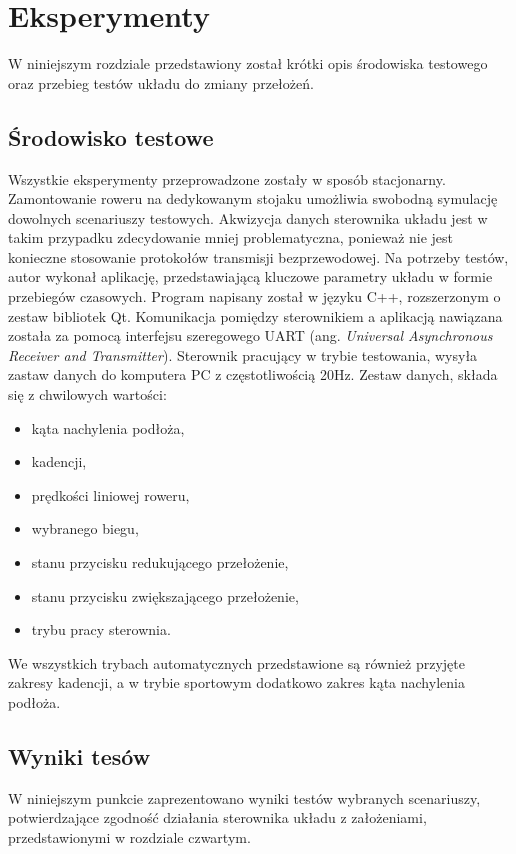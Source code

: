 \chapter{Eksperymenty}

W niniejszym rozdziale przedstawiony został krótki opis środowiska testowego oraz przebieg testów układu do zmiany przełożeń.

\section{Środowisko testowe}
Wszystkie eksperymenty przeprowadzone zostały w sposób stacjonarny. Zamontowanie roweru na dedykowanym stojaku umożliwia swobodną symulację dowolnych scenariuszy testowych. Akwizycja danych sterownika układu jest w takim przypadku zdecydowanie mniej problematyczna, ponieważ nie jest konieczne stosowanie protokołów transmisji bezprzewodowej. 
Na potrzeby testów, autor wykonał aplikację, przedstawiającą kluczowe parametry układu w formie przebiegów czasowych. Program napisany został w języku C++, rozszerzonym o zestaw bibliotek Qt. Komunikacja pomiędzy sterownikiem a aplikacją nawiązana została za pomocą interfejsu szeregowego UART (ang. \textit{Universal Asynchronous Receiver and Transmitter}). Sterownik pracujący w trybie testowania, wysyła zastaw danych do komputera PC z częstotliwością 20Hz. Zestaw danych, składa się z chwilowych wartości:
\begin{itemize}
 \item
 kąta nachylenia podłoża,
 \item
 kadencji,
 \item
 prędkości liniowej roweru,
 \item
 wybranego biegu,
 \item
 stanu przycisku redukującego przełożenie,
 \item
 stanu przycisku zwiększającego przełożenie,
 \item
 trybu pracy sterownia.
 \end{itemize}
 
We wszystkich trybach automatycznych przedstawione są również przyjęte zakresy kadencji, a w trybie sportowym dodatkowo zakres kąta nachylenia podłoża.
 
\section{Wyniki tesów}

W niniejszym punkcie zaprezentowano wyniki testów wybranych scenariuszy, potwierdzające zgodność działania sterownika układu z założeniami, przedstawionymi w rozdziale czwartym.
